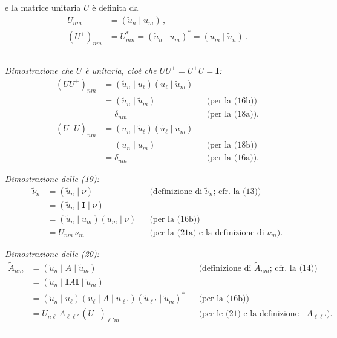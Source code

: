 \documentclass[11pt, a4paper]{book}
\numberwithin{equation}{section}
\begin{document}
e la matrice unitaria $U$ è definita da
\begin{align}
U_{nm} &= (\tilde{u}_n\mid u_m)\,, \tag{21a}\\
(U^+)_{nm} &= U_{mn}^* = (\tilde{u}_n\mid u_m)^* = (u_m\mid\tilde{u}_n)\,. \tag{21b}
\end{align}

\hrule
\medskip
\noindent\textit{Dimostrazione che $U$ è unitaria, cioè che $UU^+=U^+U=\mathbf{I}$:}
\begin{align*}
(UU^+)_{nm} &= (\tilde{u}_n\mid u_\ell)(u_\ell\mid\tilde{u}_m)\\
            &= (\tilde{u}_n\mid\tilde{u}_m) && \text{(per la (16b))}\\
            &= \delta_{nm} && \text{(per la (18a)).}\\[6pt]
(U^+U)_{nm} &= (u_n\mid\tilde{u}_\ell)(\tilde{u}_\ell\mid u_m)\\
            &= (u_n\mid u_m) && \text{(per la (18b))}\\
            &= \delta_{nm} && \text{(per la (16a)).}
\end{align*}

\noindent\textit{Dimostrazione delle (19):}
\begin{align*}
\tilde{\nu}_n &= (\tilde{u}_n\mid\nu) && \text{(definizione di $\tilde{\nu}_n$; cfr.\ la (13))}\\
              &= (\tilde{u}_n\mid\mathbf{I}\mid\nu)\\
              &= (\tilde{u}_n\mid u_m)(u_m\mid\nu) && \text{(per la (16b))}\\
              &= U_{nm}\,\nu_m && \text{(per la (21a) e la definizione di $\nu_m$).}
\end{align*}

\noindent\textit{Dimostrazione delle (20):}
\begin{align*}
\tilde{A}_{nm} &= (\tilde{u}_n\mid A\mid\tilde{u}_m) && \text{(definizione di $\tilde{A}_{nm}$; cfr.\ la (14))}\\
               &= (\tilde{u}_n\mid\mathbf{I}A\mathbf{I}\mid\tilde{u}_m)\\
               &= (\tilde{u}_n\mid u_\ell)(u_\ell\mid A\mid u_{\ell'})(\tilde{u}_{\ell'}\mid\tilde{u}_m)^* %
                  && \text{(per la (16b))}\\
               &= U_{n\ell}\,A_{\ell\ell'}\,(U^+)_{\ell' m}
                  && \text{(per le (21) e la definizione di $A_{\ell\ell'}$).}
\end{align*}
\medskip\hrule\medskip
\end{document}
